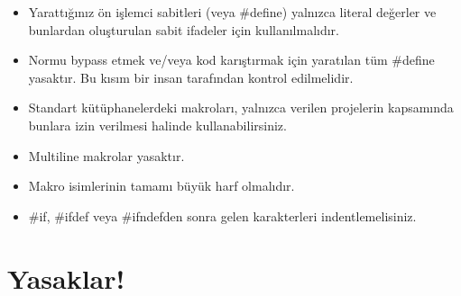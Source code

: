\documentclass{42-en}
\begin{document}
        \begin{itemize}

            \item Yarattığınız ön işlemci sabitleri (veya \#define) yalnızca literal değerler ve
bunlardan oluşturulan sabit ifadeler için kullanılmalıdır.

            \item Normu bypass etmek ve/veya kod karıştırmak için yaratılan tüm \#define yasaktır. Bu kısım bir insan tarafından kontrol edilmelidir.

            \item Standart kütüphanelerdeki makroları, yalnızca verilen projelerin kapsamında bunlara izin verilmesi halinde
kullanabilirsiniz.

            \item Multiline makrolar yasaktır.

            \item Makro isimlerinin tamamı büyük harf olmalıdır.

            \item \#if, \#ifdef veya \#ifndefden sonra gelen karakterleri indentlemelisiniz.

        \end{itemize}
        \newpage


    \section{Yasaklar!}
\end{document}
